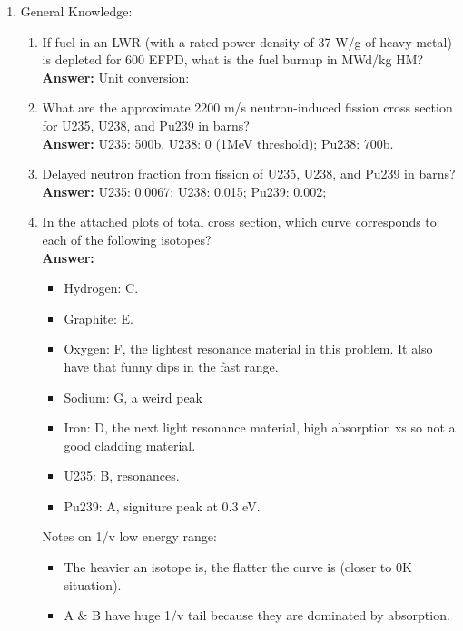 \documentclass{school-22.211-notes}
\date{February  6, 2013}
\begin{document}
\maketitle


\clearpage
{} 
\begin{enumerate}
\item General Knowledge: 
  \begin{enumerate}
  \item If fuel in an LWR (with a rated power density of 37 W/g of heavy metal) is depleted for 600 EFPD, what is the fuel burnup in MWd/kg HM?  \\
    \textbf{Answer:} Unit conversion: 
  
  \item What are the approximate 2200 m/s neutron-induced fission cross section for U235, U238, and Pu239 in barns? \\
    \textbf{Answer:} U235: 500b, U238: 0 (1MeV threshold); Pu238: 700b.  
    
  \item Delayed neutron fraction from fission of U235, U238, and Pu239 in barns? \\
     \textbf{Answer:} U235: 0.0067; U238: 0.015; Pu239: 0.002; 

   \item In the attached plots of total cross section, which curve corresponds to each of the following isotopes? \\
     \textbf{Answer:} 
     \begin{itemize}
       \item Hydrogen: C. 
       \item Graphite: E. 
       \item Oxygen: F, the lightest resonance material in this problem. It also have that funny dips in the fast range. 
       \item Sodium: G, a weird peak 
       \item Iron: D, the next light resonance material, high absorption xs so not a good cladding material. 
       \item U235: B, resonances. 
       \item Pu239: A, signiture peak at 0.3 eV. 
     \end{itemize}
     Notes on 1/v low energy range: 
     \begin{itemize}
     \item The heavier an isotope is, the flatter the curve is (closer to 0K situation). 
     \item A \& B have huge 1/v tail because they are dominated by absorption. 
     \end{itemize}


\end{enumerate}
\end{enumerate}
\end{document}
